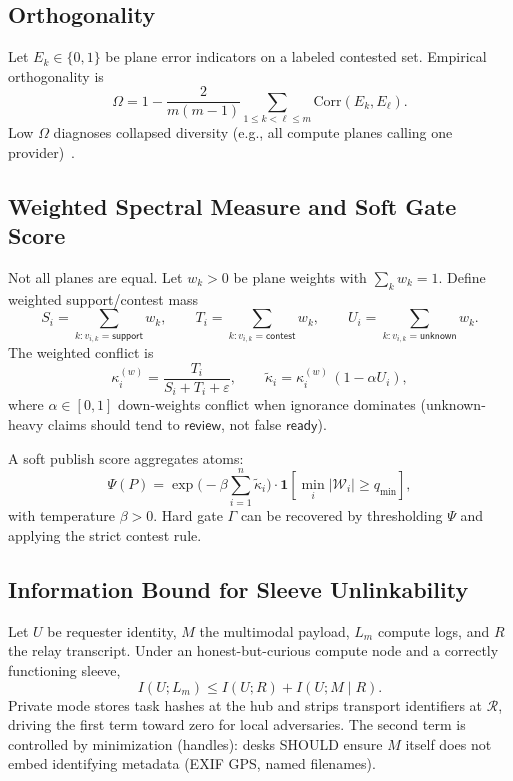 \documentclass[journal,10pt,twocolumn,a4paper]{IEEEtran}
\begin{document}
\subsection{Orthogonality}
Let $E_k\in\{0,1\}$ be plane error indicators on a labeled contested set.
Empirical orthogonality is
\begin{equation}
\label{eq:omega}
\Omega = 1 - \frac{2}{m(m-1)}\sum_{1\le k<\ell\le m}\mathrm{Corr}(E_k,E_\ell).
\end{equation}
Low $\Omega$ diagnoses collapsed diversity (e.g., all compute planes calling one provider)~\cite{bender2021stochastic}.


\subsection{Weighted Spectral Measure and Soft Gate Score}
Not all planes are equal. Let $w_k>0$ be plane weights with $\sum_k w_k=1$. Define weighted support/contest mass
\begin{equation}
S_i=\sum_{k:v_{i,k}=\mathsf{support}} w_k,\qquad
T_i=\sum_{k:v_{i,k}=\mathsf{contest}} w_k,\qquad
U_i=\sum_{k:v_{i,k}=\mathsf{unknown}} w_k.
\end{equation}
The weighted conflict is
\begin{equation}
\label{eq:kappaW}
\kappa_i^{(w)}=\frac{T_i}{S_i+T_i+\varepsilon},\qquad
\tilde{\kappa}_i=\kappa_i^{(w)}\,(1-\alpha U_i),
\end{equation}
where $\alpha\in[0,1]$ down-weights conflict when ignorance dominates (unknown-heavy claims should tend to $\mathsf{review}$, not false $\mathsf{ready}$).

A soft publish score aggregates atoms:
\begin{equation}
\label{eq:soft}
\Psi(P)=\exp\!\Big(-\beta\sum_{i=1}^{n}\tilde{\kappa}_i\Big)\cdot\mathbf{1}\!\left[\min_i|\mathcal{W}_i|\ge q_{\min}\right],
\end{equation}
with temperature $\beta>0$. Hard gate $\Gamma$ can be recovered by thresholding $\Psi$ and applying the strict contest rule.

\subsection{Information Bound for Sleeve Unlinkability}
Let $U$ be requester identity, $M$ the multimodal payload, $L_m$ compute logs, and $R$ the relay transcript.
Under an honest-but-curious compute node and a correctly functioning sleeve,
\begin{equation}
\label{eq:mi}
I(U;L_m)\le I(U;R)+I(U;M\mid R).
\end{equation}
Private mode stores task hashes at the hub and strips transport identifiers at $\mathcal{R}$, driving the first term toward zero for local adversaries. The second term is controlled by minimization (handles): desks SHOULD ensure $M$ itself does not embed identifying metadata (EXIF GPS, named filenames).
\end{document}
